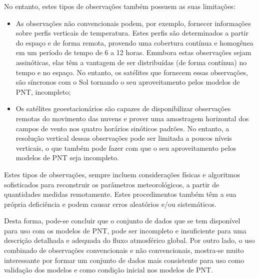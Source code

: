 No entanto, estes tipos de observações também possuem as suas limitações:

\begin{itemize}
\item As observações não convencionais podem, por exemplo, fornecer informações sobre perfis verticais de temperatura. Estes perfis são determinados a partir do espaço e de forma remota, provendo uma cobertura contínua e homogênea em um período de tempo de 6 a 12 horas. Emmbora estas observações sejam assinóticas, elas têm a vantagem de ser distribuídas (de forma contínua) no tempo e no espaço. No entanto, os satélites que fornecem essas observações, são síncronos com o Sol tornando o seu aproveitamento pelos modelos de PNT, incompleto;
\item Os satélites geoestacionários são capazes de disponibilizar observações remotas do movimento das nuvens e prover uma amostragem horizontal dos campos de vento nos quatro horários sinóticos padrões. No entanto, a resolução vertical dessas observações pode ser limitada a poucos níveis verticais, o que também pode fazer com que o seu aproveitamento pelos modelos de PNT seja incompleto.
\end{itemize}

Estes tipos de observações, sempre incluem considerações físicas e algoritmos sofisticados para reconstruir os parâmetros meteorológicos, a partir de quantidades medidas remotamente. Estes procedimentos também têm a sua própria deficiência e podem causar erros aleatórios e/ou sistemáticos.

Desta forma, pode-se concluir que o conjunto de dados que se tem disponível para uso com os modelos de PNT, pode ser incompleto e insuficiente para uma descrição detalhada e adequada do fluxo atmosférico global. Por outro lado, o uso combinado de observações convencionais e não convencionais, mostra-se muito interessante por formar um conjunto de dados mais consistente para uso como validação dos modelos e como condição inicial nos modelos de PNT. 

